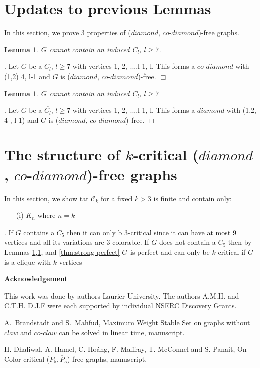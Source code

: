 \documentclass[12pt]{article}
\newtheorem{Lemma}[Theorem]{Lemma}
\def\DCD{($diamond$, $co$-$diamond$)}
\begin{document}
\section{Updates to previous Lemmas}\label{sec:updates}
In this section, we prove 3 properties of {\DCD}-free graphs.
\begin{Lemma}\label{lem:c7-free}
$G$ cannot contain an induced $C_l$, $l \geq 7$.
\end{Lemma}
. Let $G$ be a $C_l$, $l \geq 7$ with vertices 1, 2, ...,l-1, l. This forms a $co$-$diamond$ with (1,2) 4, l-1 and $G$ is {\DCD}-free. $\Box$
\begin{Lemma}\label{lem:co-c7-free}
$G$ cannot contain an induced $\overline{C_l}$, $l \geq 7$
\end{Lemma}
. Let $G$ be a $\overline{C_l}$, $l \geq 7$ with vertices 1, 2, ...,l-1, l. This forms a $diamond$ with (1,2, 4 , l-1) and $G$ is {\DCD}-free. $\Box$

\section{The structure of $k$-critical {\DCD}-free graphs}\label{sec:characterization}
In this section, we show tat $\mathcal{C}_k$ for a fixed $k > 3$ is finite and contain only:
\begin{itemize}
\item[(i)]
$K_n$ where $n = k$
\end{itemize}
. If $G$ contains a $C_5$ then it can only b 3-critical since it can have at most 9 vertices and all its variations are 3-colorable. If $G$ does not contain a $C_5$ then by Lemmas \ref{lem:c7-free},\ref{lem:co-c7-free}, and \ref{thm:strong-perfect} $G$ is perfect and can only be $k$-critical if $G$ is a clique with $k$ vertices

\begin{center}
{\bf Acknowledgement}
\end{center}
This work was done by authors  Laurier University.  The authors A.M.H. and C.T.H. D.J.F were each supported by individual NSERC Discovery Grants.


\clearpage
\begin{thebibliography}{99}

  A.~Brandstadt and S.~Mahfud, Maximum Weight Stable Set on graphs without $claw$ and $co$-$claw$ can be solved in linear time, manuscript.

  H. Dhaliwal, A. Hamel, C. Ho\'{a}ng, F. Maffray, T. McConnel and S. Panait, On Color-critical ($P_5, \overline{P}_5$)-free graphs, manuscript.

\end{thebibliography}
\end{document}
